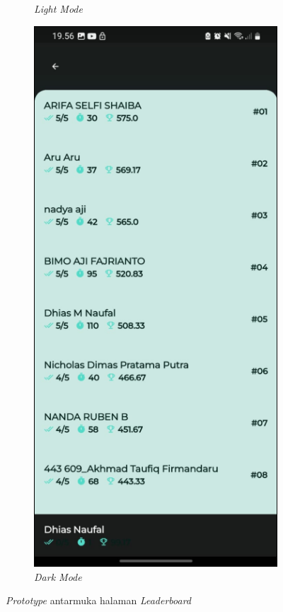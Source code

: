 \begin{figure}[H]
\begin{subfigure}[b]{0.23\textwidth}
	  \caption{\textit{Light Mode}}
	  \label{fig:HasilQuizLeader}
	\end{subfigure}
	\begin{subfigure}[b]{0.23\textwidth}
		\centering
	  \includegraphics[width=\linewidth]{contents/chapter-3/images/HF-Leaderboard-dt.png}
	  \caption{\textit{Dark Mode}}
	  \label{fig:HasilQuizLeader2}
	\end{subfigure}
	\caption{\textit{Prototype} antarmuka halaman \textit{Leaderboard}}
	\label{Fig:HasilFeatureSetLeaderboard}
\end{figure}
